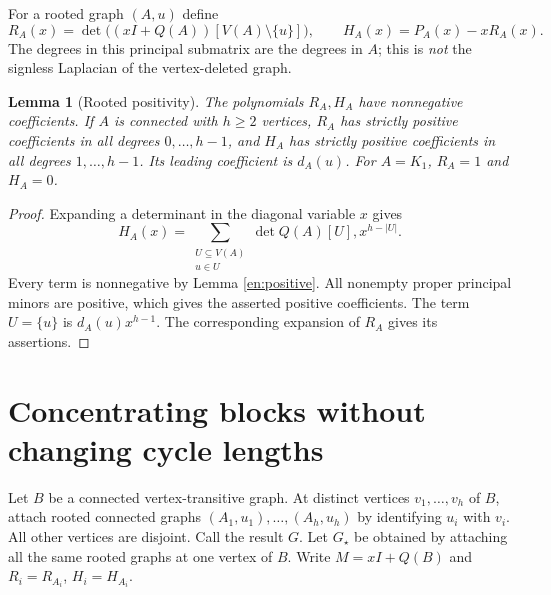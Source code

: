 \documentclass[12pt]{amsart}
\newtheorem{lem}[thm]{Lemma}
\theoremstyle{definition}
\theoremstyle{remark}
\numberwithin{equation}{section}
\begin{document}
For a rooted graph $(A,u)$ define
\begin{equation}\label{en:RH}
 R_A(x)=\det\bigl((xI+Q(A))[V(A)\setminus\{u\}]\bigr),\qquad
 H_A(x)=P_A(x)-xR_A(x).
\end{equation}
The degrees in this principal submatrix are the degrees in $A$; this is
\emph{not} the signless Laplacian of the vertex-deleted graph.

\begin{lem}[Rooted positivity]\label{en:rooted}
The polynomials $R_A,H_A$ have nonnegative coefficients. If $A$ is
connected with $h\ge2$ vertices, $R_A$ has strictly positive coefficients
in all degrees $0,\ldots,h-1$, and $H_A$ has strictly positive coefficients
in all degrees $1,\ldots,h-1$. Its leading coefficient is $d_A(u)$.
For $A=K_1$, $R_A=1$ and $H_A=0$.
\end{lem}
\begin{proof}
Expanding a determinant in the diagonal variable $x$ gives
\[
 H_A(x)=\sum_{\substack{U\subseteq V(A)\\u\in U}}
       \det Q(A)[U],x^{h-|U|}.
\]
Every term is nonnegative by Lemma \ref{en:positive}. All nonempty
proper principal minors are positive, which gives the asserted positive
coefficients. The term $U=\{u\}$ is $d_A(u)x^{h-1}$.
The corresponding expansion of $R_A$ gives its assertions.
\end{proof}

\section{Concentrating blocks without changing cycle lengths}
Let $B$ be a connected vertex-transitive graph. At distinct vertices
$v_1,\ldots,v_h$ of $B$, attach rooted connected graphs
$(A_1,u_1),\ldots,(A_h,u_h)$ by identifying $u_i$ with $v_i$.
All other vertices are disjoint. Call the result $G$. Let $G_\star$ be
obtained by attaching all the same rooted graphs at one vertex of $B$.
Write $M=xI+Q(B)$ and
$R_i=R_{A_i}$, $H_i=H_{A_i}$.
\end{document}
